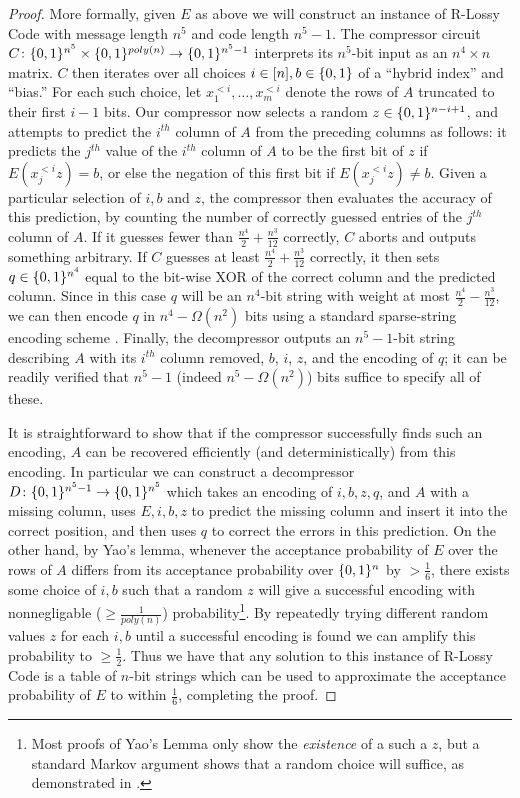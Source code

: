 \begin{proof}
More formally, given $E$ as above we will construct an instance of {\sc R-Lossy Code} with message length $n^5$ and code length $n^5-1$. The compressor circuit $C\colon \{0,1\}^{n^5} \times \{0,1\}^{poly(n)} \to \{0,1\}^{n^5-1}$ interprets its $n^5$-bit input as an $n^4 \times n$ matrix. $C$ then iterates over all choices $i \in [n], b \in \{0,1\}$ of a ``hybrid index'' and ``bias.'' For each such choice, let $x^{<i}_1,\ldots,x^{<i}_m$ denote the rows of $A$ truncated to their first $i-1$ bits. Our compressor now selects a random $z \in \{0,1\}^{n - i + 1}$, and attempts to predict the $i^{th}$ column of $A$ from the preceding columns as follows: it predicts the $j^{th}$ value of the $i^{th}$ column of $A$ to be the first bit of $z$ if $E(x^{<i}_j z)= b$, or else the negation of this first bit if $E(x^{<i}_j z)\neq b$. Given a particular selection of $i,b$ and $z$, the compressor then evaluates the accuracy of this prediction, by counting the number of correctly guessed entries of the $j^{th}$ column of $A$. If it guesses fewer than $\frac{n^4}{2} + \frac{n^3}{12}$ correctly, $C$ aborts and outputs something arbitrary. If $C$ guesses at least $\frac{n^4}{2} + \frac{n^3}{12}$ correctly, it then sets $q \in \{0,1\}^{n^4}$ equal to the bit-wise XOR of the correct column and the predicted column. Since in this case $q$ will be an $n^4$-bit string with weight at most $\frac{n^4}{2}-\frac{n^3}{12}$, we can then encode $q$ in $n^4-\Omega(n^2)$ bits using a standard sparse-string encoding scheme \cite{Korten}. Finally, the decompressor outputs an $n^5-1$-bit string describing $A$ with its $i^{th}$ column removed, $b$, $i$, $z$, and the encoding of $q$; it can be readily verified that $n^5-1$ (indeed $n^5 - \Omega(n^2)$) bits suffice to specify all of these.

It is straightforward to show that if the compressor successfully finds such an encoding, $A$ can be recovered efficiently (and deterministically) from this encoding. In particular we can construct a decompressor $D\colon \{0,1\}^{n^5-1} \to \{0,1\}^{n^5}$ which takes an encoding of $i,b,z,q$, and $A$ with a missing column, uses $E,i,b,z$ to predict the missing column and insert it into the correct position, and then uses $q$ to correct the errors in this prediction. On the other hand, by Yao's lemma, whenever the acceptance probability of $E$ over the rows of $A$ differs from its acceptance probability over $\{0,1\}^n$ by $> \frac{1}{6}$, there exists some choice of $i,b$ such that a random $z$ will give a successful encoding with nonnegligable ($\geq \frac{1}{poly(n)}$) probability\footnote{Most proofs of Yao's Lemma only show the \emph{existence} of a such a $z$, but a standard Markov argument shows that a random choice will suffice, as demonstrated in \cite{Hirahara}.}. By repeatedly trying different random values $z$ for each $i,b$ until a successful encoding is found we can amplify this probability to $\geq \frac{1}{2}$. Thus we have that any solution to this instance of {\sc R-Lossy Code} is a table of $n$-bit strings which can be used to approximate the acceptance probability of $E$ to within $\frac{1}{6}$, completing the proof.
\end{proof}
